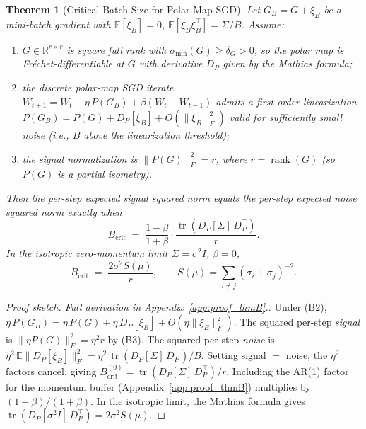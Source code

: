 \documentclass{article}
\newtheorem{theorem}{Theorem}
\begin{document}
\begin{theorem}[Critical Batch Size for Polar-Map SGD]
\label{thm:thmB}
Let $G_B=G+\xi_B$ be a mini-batch gradient with $\mathbb E[\xi_B]=0$, $\mathbb E[\xi_B\xi_B^\top]=\Sigma/B$. Assume:
\begin{enumerate}[label=(\textit{B\arabic*})]
\item $G\in\mathbb R^{r\times r}$ is \emph{square} full rank with $\sigma_{\min}(G)\geq\delta_G>0$, so the polar map is Fr\'echet-differentiable at $G$ with derivative $D_P$ given by the Mathias formula;
\item the discrete polar-map SGD iterate $W_{t+1}=W_t-\eta\,P(G_B)+\beta(W_t-W_{t-1})$ admits a first-order linearization $P(G_B)=P(G)+D_P[\xi_B]+O(\|\xi_B\|_F^2)$ valid for sufficiently small noise (i.e., $B$ above the linearization threshold);
\item the signal normalization is $\|P(G)\|_F^2=r$, where $r=\operatorname{rank}(G)$ (so $P(G)$ is a partial isometry).
\end{enumerate}
Then the per-step expected signal squared norm equals the per-step expected noise squared norm exactly when
\begin{equation}
B_{\mathrm{crit}} \;=\; \frac{1-\beta}{1+\beta}\cdot\frac{\operatorname{tr}(D_P[\Sigma]\,D_P^\top)}{r}.
\label{eq:bcrit_general}
\end{equation}
In the isotropic zero-momentum limit $\Sigma=\sigma^2 I$, $\beta=0$,
\begin{equation}
B_{\mathrm{crit}} \;=\; \frac{2\sigma^2 S(\mu)}{r},\qquad S(\mu) = \sum_{i\neq j}(\sigma_i+\sigma_j)^{-2}.
\label{eq:bcrit_simple}
\end{equation}
\end{theorem}

\begin{proof}[Proof sketch. Full derivation in Appendix~\ref{app:proof_thmB}.]
Under (B2), $\eta\,P(G_B)=\eta\,P(G)+\eta\,D_P[\xi_B]+O(\eta\|\xi_B\|_F^2)$. The squared per-step \emph{signal} is $\|\eta P(G)\|_F^2=\eta^2 r$ by (B3). The squared per-step \emph{noise} is $\eta^2\,\mathbb E\|D_P[\xi_B]\|_F^2 = \eta^2\,\operatorname{tr}(D_P[\Sigma]\,D_P^\top)/B$. Setting signal $=$ noise, the $\eta^2$ factors cancel, giving $B_{\mathrm{crit}}^{(0)}=\operatorname{tr}(D_P[\Sigma]\,D_P^\top)/r$. Including the AR(1) factor for the momentum buffer (Appendix~\ref{app:proof_thmB}) multiplies by $(1-\beta)/(1+\beta)$. In the isotropic limit, the Mathias formula gives $\operatorname{tr}(D_P[\sigma^2 I]\,D_P^\top)=2\sigma^2 S(\mu)$.
\end{proof}
\end{document}
